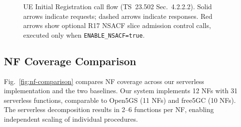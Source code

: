 \documentclass[conference]{IEEEtran}
\begin{document}
\begin{figure}[t]
\caption{UE Initial Registration call flow (TS~23.502 Sec.~4.2.2.2). Solid arrows indicate requests; dashed arrows indicate responses. Red arrows show optional R17 NSACF slice admission control calls, executed only when \texttt{ENABLE\_NSACF=true}.}
\label{fig:regflow}
\end{figure}

\subsection{NF Coverage Comparison}

Fig.~\ref{fig:nf-comparison} compares NF coverage across our serverless implementation and the two baselines. Our system implements 12 NFs with 31 serverless functions, comparable to Open5GS (11 NFs) and free5GC (10 NFs). The serverless decomposition results in 2--6 functions per NF, enabling independent scaling of individual procedures.
\end{document}
